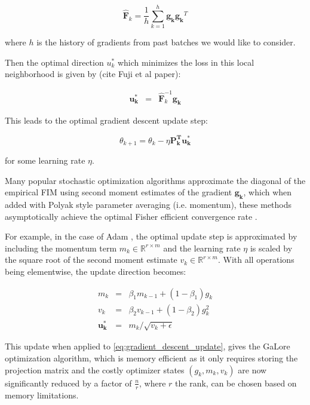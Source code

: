 \[
\mathbf{\hat{F}}_{k} = \frac{1}{h} \sum_{k=1}^{h} \mathbf{g_{k}} \mathbf{g_{k}}^{T}
\]

where \(h\) is the history of gradients from past batches we would like to consider.

Then the optimal direction \(u_{k}^{*}\) which minimizes the loss in this local neighborhood is given by (cite Fuji et al paper):

\begin{eqnarray}
\mathbf{u_{k}^{*}} &=& \mathbf{\hat{F}}_{k}^{-1} \mathbf{g_{k}}
\label{eq:optimal_direction}
\end{eqnarray}

This leads to the optimal gradient descent update step:

\[
\theta_{k+1} = \theta_{k} - \eta \mathbf{P_{k}^T u^*_{k}}
\label{eq:gradient_descent_update}
\]

for some learning rate \(\eta\).

Many popular stochastic optimization algorithms approximate the diagonal of the empirical FIM using second moment estimates of the gradient \(\mathbf{g_{k}}\), which when added with Polyak style parameter averaging (i.e. momentum), these methods asymptotically achieve the optimal Fisher efficient convergence rate \citep{martens2020new}.

For example, in the case of Adam \citep{}, the optimal update step is approximated by including the momentum term \(m_{k} \in \mathbb{R}^{r\times m}\) and the learning rate \(\eta\) is scaled by the square root of the second moment estimate \(v_{k} \in \mathbb{R}^{r\times m}\). With all operations being elementwise, the update direction becomes:

\begin{eqnarray}
    m_{k} &=& \beta_{1} m_{k-1} + (1-\beta_{1}) g_{k} \\
    v_{k} &=& \beta_{2} v_{k-1} + (1-\beta_2) g^{2}_{k}  \\
    \mathbf{u_{k}^{*}} &=& m_{k} / \sqrt{v_{k} + \epsilon}
    \label{eq:adam_update}
\end{eqnarray}

This update when applied to \ref{eq:gradient_descent_update}, gives the GaLore optimization algorithm, which is memory efficient as it only requires storing the projection matrix and the costly optimizer states \(\left(g_{k}, m_{k}, v_{k}\right)\) are now significantly reduced by a factor of \(\frac{n}{r}\), where \(r\) the rank, can be chosen based on memory limitations.


